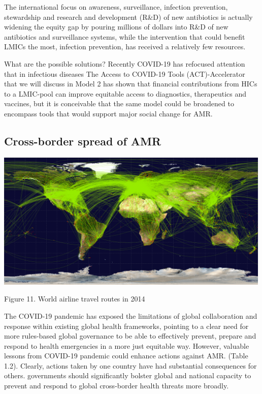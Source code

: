 \documentclass[]{tufte-handout}
\begin{document}
The international focus on awareness, surveillance, infection
prevention, stewardship and research and development (R\&D) of new
antibiotics is actually widening the equity gap by pouring millions of
dollars into R\&D of new antibiotics and surveillance systems, while the
intervention that could benefit LMICs the most, infection prevention,
has received a relatively few resources.

What are the possible solutions? Recently COVID-19 has refocused
attention that in infectious diseases The Access to COVID-19 Tools
(ACT)-Accelerator that we will discuss in Model 2 has shown that
financial contributions from HICs to a LMIC-pool can improve equitable
access to diagnostics, therapeutics and vaccines, but it is conceivable
that the same model could be broadened to encompass tools that would
support major social change for AMR.

\hypertarget{cross-border-spread-of-amr}{%
\subsection*{Cross-border spread of
AMR}\label{cross-border-spread-of-amr}}

\includegraphics[width=5.20833in,height=\textheight]{images/worldairlineroute2014.png}

Figure 11. World airline travel routes in 2014

The COVID-19 pandemic has exposed the limitations of global
collaboration and response within existing global health frameworks,
pointing to a clear need for more rules-based global governance to be
able to effectively prevent, prepare and respond to health emergencies
in a more just equitable way. However, valuable lessons from COVID-19
pandemic could enhance actions against AMR. (Table 1.2). Clearly,
actions taken by one country have had substantial consequences for
others. governments should significantly bolster global and national
capacity to prevent and respond to global cross-border health threats
more broadly.
\end{document}
